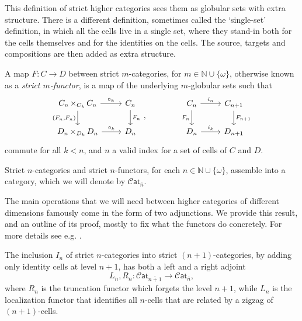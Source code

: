 \documentclass[12pt,a4paper]{article}
\numberwithin{equation}{section}
\newcommand{\cat}[1]{\mathscr{C} \mathsf{at}_{\overline{#1}}}
\begin{document}
\begin{remark}
    This definition of strict higher categories sees them as globular sets with extra structure. There is a different definition, sometimes called the `single-set' definition, in which all the cells live in a single set, where they stand-in both for the cells themselves and for the identities on the cells. The source, targets and compositions are then added as extra structure.
\end{remark}

\begin{definition}
    A map $F\colon C \to D$ between strict $m$-categories, for $m \in \mathbb{N} \cup \{ \omega\}$, otherwise known as a \emph{strict $m$-functor}, is a map of the underlying $m$-globular sets such that
    \begin{equation}
        \begin{tikzcd}
            C_n \mathop{\times}_{C_k} C_n \arrow[r, "\circ_k"] \arrow[d, "{(F_n, F_n)}"'] & C_n \arrow[d, "F_n"] \\
            D_n \mathop{\times}_{D_k} D_n \arrow[r, "\circ_k"] & D_n
        \end{tikzcd}\, , \qquad\qquad
        \begin{tikzcd}
            C_n \arrow[r, "i_n"] \arrow[d, "F_n"'] & C_{n+1} \arrow[d, "F_{n+1}"] \\
            D_n \arrow[r, "i_k"] & D_{n+1}
        \end{tikzcd}
    \end{equation}
    commute for all $k < n$, and $n$ a valid index for a set of cells of $C$ and $D$.
\end{definition}

\begin{lemma}
    Strict $n$-categories and strict $n$-functors, for each $n \in \mathbb{N} \cup \{ \omega\}$, assemble into a category, which we will denote by $\cat{n}$.
\end{lemma}

The main operations that we will need between higher categories of different dimensions famously come in the form of two adjunctions. We provide this result, and an outline of its proof, mostly to fix what the functors do concretely. For more details see e.g. \cite[\S 14.4.6]{ara}.

\begin{proposition}\label{prop:cat_adjunctions}
    The inclusion $I_n$ of strict $n$-categories into strict $(n+1)$-categories, by adding only identity cells at level $n+1$, has both a left and a right adjoint
    \begin{equation}
        L_n, R_n: \cat{n+1} \xrightarrow{\quad} \cat{n},
    \end{equation}
    where $R_n$ is the truncation functor which forgets the level $n+1$, while $L_n$ is the localization functor that identifies all $n$-cells that are related by a zigzag of $(n+1)$-cells.
\end{proposition}
\end{document}
